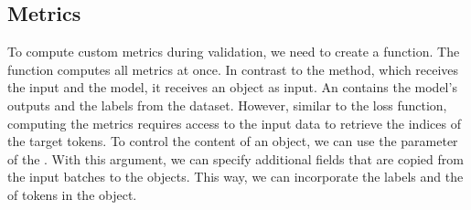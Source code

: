 \documentclass[letterpaper,10pt,english]{jupyterBook}
\begin{document}
\subsection{Metrics}
\label{\detokenize{HuggingFaceTrainer:metrics}}
\sphinxAtStartPar
To compute custom metrics during validation, we need to create a function.
The function computes all metrics at once.
In contrast to the \sphinxhyphen{}method, which receives the input and the model, it receives an  object as input.
An  contains the model’s outputs and the labels from the dataset.
However, similar to the loss function, computing the metrics requires access to the input data to retrieve the indices of the target tokens.
To control the content of an  object, we can use the  parameter of the .
With this argument, we can specify additional fields that are copied from the input batches to the  objects.
This way, we can incorporate the labels and the  of tokens in the  object.
\end{document}
